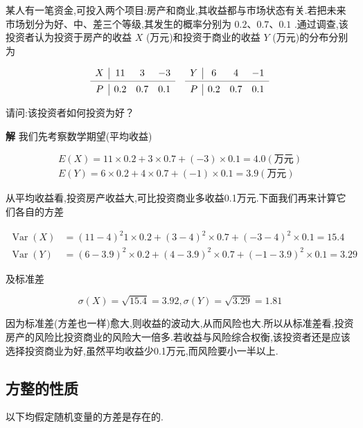 \begin{example}
	某人有一笔资金,可投入两个项目:房产和商业,其收益都与市场状态有关.若把未来市场划分为好、中、差三个等级,其发生的概率分别为 $ 0.2、0.7、0.1 $ .通过调查,该投资者认为投资于房产的收益 $ X $ (万元)和投资于商业的收益 $ Y $ (万元)的分布分别为
	
	\[
	\begin{array}{c|ccccc|ccc}
	X     & 11    & 3     & -3    &       & Y     & 6     & 4     & -1 \\
	\cmidrule{1-4}\cmidrule{6-9}    P     & 0.2   & 0.7   & 0.1   &       & P     & 0.2   & 0.7   & 0.1 \\
	\end{array}
	\]
	
	请问:该投资者如何投资为好？
	
	\textbf{解} 我们先考察数学期望(平均收益)
	
	\[
	\begin{array}{c}
	{E(X)=11 \times 0.2+3 \times 0.7+(-3) \times 0.1=4.0 (\text{万元})} \\ 
	{E(Y)=6 \times 0.2+4 \times 0.7+(-1) \times 0.1=3.9(\text{万元})}
	\end{array}
	\]
	
	从平均收益看,投资房产收益大,可比投资商业多收益0.1万元.下面我们再来计算它们各自的方差
	
	\[
	\begin{aligned} 
	\operatorname{Var}(X) & =(11-4)^{2} 1 \times 0.2+(3-4)^{2} \times 0.7+(-3-4)^{2} \times 0.1=15.4 \\ 
	\operatorname{Var}(Y) & =(6-3.9)^{2} \times 0.2+(4-3.9)^{2} \times 0.7+(-1-3.9)^{2} \times 0.1=3.29 
	\end{aligned}
	\]
	
	及标准差
	
	\[
	\sigma(X)=\sqrt{15.4}=3.92, \sigma(Y)=\sqrt{3.29}=1.81
	\]
	
	因为标准差(方差也一样)愈大,则收益的波动大,从而风险也大.所以从标准差看,投资房产的风险比投资商业的风险大一倍多.若收益与风险综合权衡,该投资者还是应该选择投资商业为好,虽然平均收益少0.1万元,而风险要小一半以上.
	
\end{example}

\subsection{方整的性质}

以下均假定随机变量的方差是存在的.

